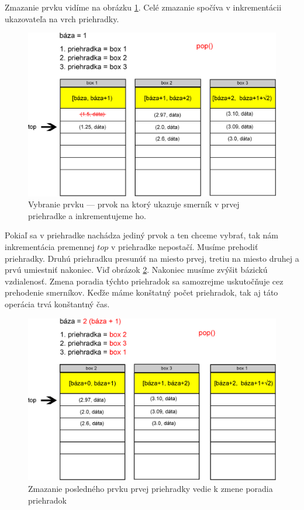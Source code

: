 Zmazanie prvku vidíme na obrázku \ref{fig:priehradky_i_d1}.
Celé zmazanie spočíva v inkrementácii ukazovateľa na vrch priehradky.

\begin{figure}[h]
\centering
\includegraphics[width=\textwidth]{./img/priehradky_naplnene_default_i_d1.eps}
\caption{Vybranie prvku --- prvok na ktorý ukazuje smerník v prvej priehradke a inkrementujeme ho.}
\label{fig:priehradky_i_d1}
\end{figure}


Pokiaľ sa v priehradke nachádza jediný prvok a ten chceme vybrať, tak nám inkrementácia premennej $ top $ v priehradke 
nepostačí. Musíme prehodiť priehradky. Druhú priehradku presunúť
na miesto prvej, tretiu na miesto druhej a prvú umiestniť nakoniec. Viď obrázok \ref{fig:priehradky_i_d2}. Nakoniec musíme zvýšit bázickú vzdialenosť. Zmena poradia týchto priehradok sa samozrejme uskutočňuje cez prehodenie smerníkov.
Keďže máme konštatný počet priehradok, tak aj táto operácia
trvá konštantný čas.

\begin{figure}[h]
\centering
\includegraphics[width=\textwidth]{./img/priehradky_naplnene_default_i_d2.eps}
\caption{Zmazanie posledného prvku prvej priehradky vedie k zmene poradia priehradok}
\label{fig:priehradky_i_d2}
\end{figure}



